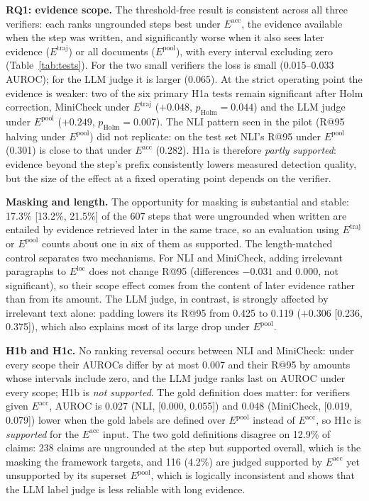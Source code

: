 \documentclass[conference]{IEEEtran}
\newcommand{\Eloc}{E^{\mathrm{loc}}}
\newcommand{\Eacc}{E^{\mathrm{acc}}}
\newcommand{\Etraj}{E^{\mathrm{traj}}}
\newcommand{\Epool}{E^{\mathrm{pool}}}
\begin{document}
\textbf{RQ1: evidence scope.} The threshold-free result is consistent across all three verifiers: each ranks ungrounded steps best under $\Eacc$, the evidence available when the step was written, and significantly worse when it also sees later evidence ($\Etraj$) or all documents ($\Epool$), with every interval excluding zero (Table~\ref{tab:tests}). For the two small verifiers the loss is small (0.015--0.033 AUROC); for the LLM judge it is larger (0.065). At the strict operating point the evidence is weaker: two of the six primary H1a tests remain significant after Holm correction, MiniCheck under $\Etraj$ ($+0.048$, $p_{\mathrm{Holm}}=0.044$) and the LLM judge under $\Epool$ ($+0.249$, $p_{\mathrm{Holm}}=0.007$). The NLI pattern seen in the pilot (R@95 halving under $\Epool$) did not replicate: on the test set NLI's R@95 under $\Epool$ (0.301) is close to that under $\Eacc$ (0.282). H1a is therefore \emph{partly supported}: evidence beyond the step's prefix consistently lowers measured detection quality, but the size of the effect at a fixed operating point depends on the verifier.

\textbf{Masking and length.} The opportunity for masking is substantial and stable: 17.3\% [13.2\%, 21.5\%] of the 607 steps that were ungrounded when written are entailed by evidence retrieved later in the same trace, so an evaluation using $\Etraj$ or $\Epool$ counts about one in six of them as supported. The length-matched control separates two mechanisms. For NLI and MiniCheck, adding irrelevant paragraphs to $\Eloc$ does not change R@95 (differences $-0.031$ and $0.000$, not significant), so their scope effect comes from the content of later evidence rather than from its amount. The LLM judge, in contrast, is strongly affected by irrelevant text alone: padding lowers its R@95 from 0.425 to 0.119 ($+0.306$ [0.236, 0.375]), which also explains most of its large drop under $\Epool$.

\textbf{H1b and H1c.} No ranking reversal occurs between NLI and MiniCheck: under every scope their AUROCs differ by at most 0.007 and their R@95 by amounts whose intervals include zero, and the LLM judge ranks last on AUROC under every scope; H1b is \emph{not supported}. The gold definition does matter: for verifiers given $\Eacc$, AUROC is 0.027 (NLI, [0.000, 0.055]) and 0.048 (MiniCheck, [0.019, 0.079]) lower when the gold labels are defined over $\Epool$ instead of $\Eacc$, so H1c is \emph{supported} for the $\Eacc$ input. The two gold definitions disagree on 12.9\% of claims: 238 claims are ungrounded at the step but supported overall, which is the masking the framework targets, and 116 (4.2\%) are judged supported by $\Eacc$ yet unsupported by its superset $\Epool$, which is logically inconsistent and shows that the LLM label judge is less reliable with long evidence.
\end{document}

